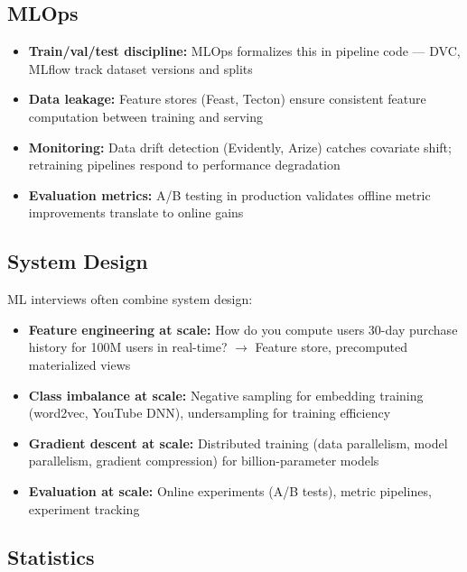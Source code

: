 \documentclass[11pt]{article}
\providecommand{\tightlist}{\setlength{\itemsep}{1pt}\setlength{\parskip}{0pt}}
\begin{document}
\subsection{MLOps}\label{mlops}

\begin{itemize}
\tightlist
\item
  \textbf{Train/val/test discipline:} MLOps formalizes this in pipeline code --- DVC, MLflow track dataset versions and splits
\item
  \textbf{Data leakage:} Feature stores (Feast, Tecton) ensure consistent feature computation between training and serving
\item
  \textbf{Monitoring:} Data drift detection (Evidently, Arize) catches covariate shift; retraining pipelines respond to performance degradation
\item
  \textbf{Evaluation metrics:} A/B testing in production validates offline metric improvements translate to online gains
\end{itemize}

\subsection{System Design}\label{system-design}

ML interviews often combine system design:

\begin{itemize}
\tightlist
\item
  \textbf{Feature engineering at scale:} How do you compute user\textquotesingle s 30-day purchase history for 100M users in real-time? \(\rightarrow\) Feature store, precomputed materialized views
\item
  \textbf{Class imbalance at scale:} Negative sampling for embedding training (word2vec, YouTube DNN), undersampling for training efficiency
\item
  \textbf{Gradient descent at scale:} Distributed training (data parallelism, model parallelism, gradient compression) for billion-parameter models
\item
  \textbf{Evaluation at scale:} Online experiments (A/B tests), metric pipelines, experiment tracking
\end{itemize}

\subsection{Statistics}\label{statistics}
\end{document}
